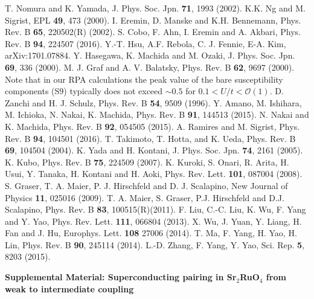 \documentclass[aps,prl,twocolumn,superscriptaddress,showpacs]{revtex4-1}
\begin{document}
\begin{thebibliography}{99}
 T. Nomura and K. Yamada, J. Phys. Soc. Jpn. {\bf 71}, 1993 (2002).
 K.K. Ng and M. Sigrist, EPL {\bf 49}, 473 (2000).
 I. Eremin, D. Manske and K.H. Bennemann, Phys. Rev. B {\bf 65}, 220502(R) (2002).
 S. Cobo, F. Ahn, I. Eremin and A. Akbari, Phys. Rev. B {\bf 94}, 224507 (2016).
 Y.-T. Hsu, A.F. Rebola, C. J. Fennie, E-A. Kim, arXiv:1701.07884.
 Y. Hasegawa, K. Machida and M. Ozaki, J. Phys. Soc. Jpn. {\bf 69}, 336 (2000).
 M. J. Graf and A. V. Balatsky, Phys. Rev. B {\bf 62}, 9697 (2000).
 Note that in our RPA calculations the peak value of the bare susceptibility components (S9) typically does not exceed $\sim 0.5$ for $0.1<U/t < \mathcal{O}(1)$.
 D. Zanchi and H. J. Schulz, Phys. Rev. B {\bf 54}, 9509 (1996).
 Y. Amano, M. Ishihara, M. Ichioka, N. Nakai, K. Machida, Phys. Rev. B {\bf 91}, 144513 (2015).
 N. Nakai and K. Machida, Phys. Rev. B {\bf 92}, 054505 (2015).
 A. Ramires and M. Sigrist, Phys. Rev. B {\bf 94}, 104501 (2016).
 T. Takimoto, T. Hotta, and K. Ueda, Phys. Rev. B \textbf{69}, 104504 (2004).
 K. Yada and H. Kontani, J. Phys. Soc. Jpn. \textbf{74}, 2161 (2005).
 K. Kubo, Phys. Rev. B \textbf{75}, 224509 (2007).
 K. Kuroki, S. Onari, R. Arita, H. Usui, Y. Tanaka, H. Kontani and H. Aoki, Phys. Rev. Lett. \textbf{101}, 087004 (2008).
 S. Graser, T. A. Maier, P. J. Hirschfeld and D. J. Scalapino, New Journal of Physics \textbf{11}, 025016 (2009).
 T. A. Maier, S. Graser, P.J. Hirschfeld and D.J. Scalapino, Phys. Rev. B \textbf{83}, 100515(R)(2011).
 F. Liu, C.-C. Liu, K. Wu, F. Yang and Y. Yao, Phys. Rev. Lett. \textbf{111}, 066804 (2013).
 X. Wu, J. Yuan, Y. Liang, H. Fan and J. Hu, Europhys. Lett. \textbf{108} 27006 (2014).
 T. Ma, F. Yang, H. Yao, H. Lin,   Phys. Rev. B \textbf{90}, 245114 (2014).
 L.-D. Zhang, F. Yang, Y. Yao, Sci. Rep. \textbf{5}, 8203 (2015).
\end{thebibliography}


\newpage

\begin{center}
\textbf{\large Supplemental Material: Superconducting pairing in Sr$_2$RuO$_4$ from weak to intermediate coupling}
\end{center}
\end{document}
